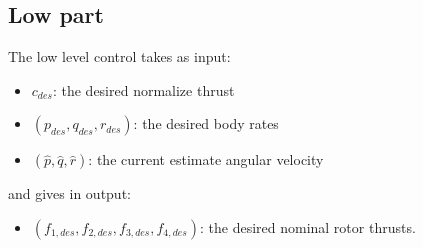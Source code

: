 \subsection{Low part}
The low level control takes as input:
 \begin{itemize}
\item $c_{des}$: the desired normalize thrust 
\item $(p_{des},q_{des},r_{des})$: the desired body rates
\item $(\hat{p},\hat{q},\hat{r})$: the current estimate angular velocity
\end{itemize}
and gives in output:
\begin{itemize}
\item $(f_{1,des},f_{2,des},f_{3,des},f_{4,des})$: the desired nominal rotor thrusts.
\end{itemize}

